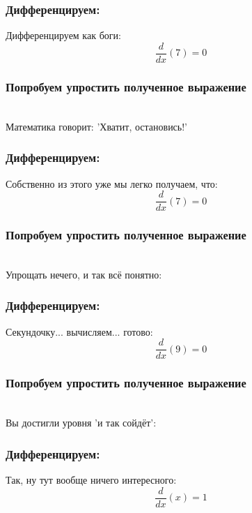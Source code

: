 \documentclass[a4paper,12pt]{article}
\begin{document}
\subsubsection*{Дифференцируем:}

Дифференцируем как боги:
\begin{dmath}\frac{d}{dx}\left(7\right)=0\end{dmath}
\subsubsection*{Попробуем упростить полученное выражение}
\\Математика говорит: 'Хватит, остановись!'

\subsubsection*{Дифференцируем:}

Собственно из этого уже мы легко получаем, что:
\begin{dmath}\frac{d}{dx}\left(7\right)=0\end{dmath}
\subsubsection*{Попробуем упростить полученное выражение}
\\Упрощать нечего, и так всё понятно:

\subsubsection*{Дифференцируем:}

Секундочку... вычисляем... готово:
\begin{dmath}\frac{d}{dx}\left(9\right)=0\end{dmath}
\subsubsection*{Попробуем упростить полученное выражение}
\\Вы достигли уровня 'и так сойдёт':

\subsubsection*{Дифференцируем:}

Так, ну тут вообще ничего интересного:
\begin{dmath}\frac{d}{dx}\left(x\right)=1\end{dmath}
\end{document}

